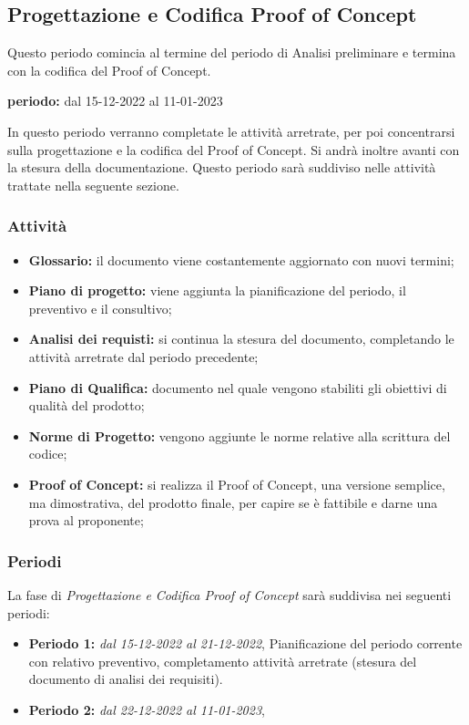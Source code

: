 \subsection{Progettazione e Codifica Proof of Concept}
Questo periodo comincia al termine del periodo di Analisi preliminare e termina con la codifica
del Proof of Concept.\\
\begin{center}
\textbf{periodo:} dal 15-12-2022 al 11-01-2023\\
\end{center}
In questo periodo verranno completate le attività arretrate, per poi concentrarsi sulla 
progettazione e la codifica del Proof of Concept. Si andrà inoltre avanti con la stesura 
della documentazione. Questo periodo sarà suddiviso nelle attività trattate nella seguente sezione.
\subsubsection{Attività}
\begin{itemize}
\item \textbf{Glossario:} il documento viene costantemente aggiornato con nuovi termini;
\item \textbf{Piano di progetto:} viene aggiunta la pianificazione del periodo, il preventivo e il consultivo;  
\item \textbf{Analisi dei requisti:} si continua la stesura del documento, completando le attività arretrate dal periodo precedente;
\item \textbf{Piano di Qualifica:} documento nel quale vengono stabiliti gli obiettivi di qualità del prodotto;
\item \textbf{Norme di Progetto:} vengono aggiunte le norme relative alla scrittura del codice;
\item \textbf{Proof of Concept:} si realizza il Proof of Concept, una versione semplice, ma dimostrativa, del prodotto finale, per 
capire se è fattibile e darne una prova al proponente;   
\end{itemize}

\subsubsection{Periodi}
La fase di \textit{Progettazione e Codifica Proof of Concept} sarà suddivisa nei seguenti periodi:
\begin{itemize}
\item \textbf{Periodo 1:} \textit{dal 15-12-2022 al 21-12-2022}, Pianificazione del periodo corrente con relativo preventivo, completamento attività arretrate (stesura del documento di analisi dei requisiti).
\item \textbf{Periodo 2:} \textit{dal 22-12-2022 al 11-01-2023}, 
\end{itemize}

